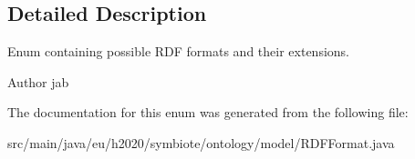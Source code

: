 \subsection{Detailed Description}
Enum containing possible R\+DF formats and their extensions.

\begin{DoxyAuthor}{Author}
jab 
\end{DoxyAuthor}


The documentation for this enum was generated from the following file\+:\begin{DoxyCompactItemize}
\item 
src/main/java/eu/h2020/symbiote/ontology/model/R\+D\+F\+Format.\+java\end{DoxyCompactItemize}
